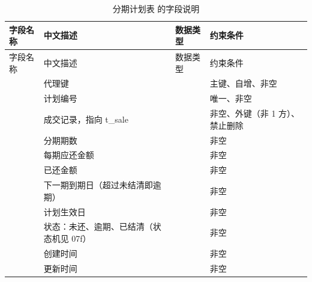 \begin{longtable}{@{}L{3.5cm} L{4.1cm} L{2.9cm} L{4.0cm}@{}}
\caption{分期计划表  的字段说明}\label{tab:f-t-installment}\\
\toprule
字段名称 & 中文描述 & 数据类型 & 约束条件 \\
\midrule
\endfirsthead
\toprule
字段名称 & 中文描述 & 数据类型 & 约束条件 \\
\midrule
\endhead
\bottomrule
\endlastfoot
{} & 代理键 &  & 主键、自增、非空 \\
 & 计划编号 &  & 唯一、非空 \\
 & 成交记录，指向 t\_sale &  & 非空、外键（非 1 方）、禁止删除 \\
 & 分期期数 &  & 非空 \\
 & 每期应还金额 &  & 非空 \\
 & 已还金额 &  & 非空 \\
 & 下一期到期日（超过未结清即逾期） &  & 非空 \\
 & 计划生效日 &  & 非空 \\
 & 状态：未还、逾期、已结清（状态机见 07f） &  & 非空 \\
 & 创建时间 &  & 非空 \\
 & 更新时间 &  & 非空 \\
\end{longtable}

